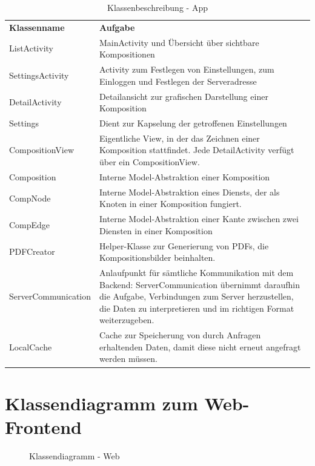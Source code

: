 \begin{table}[h]
	\centering
	\begin{tabularx}{\textwidth}{X X}
		\rowcolor[HTML]{C0C0C0} 
		\textbf{Klassenname} & \textbf{Aufgabe} \\
		ListActivity & MainActivity und Übersicht über sichtbare Kompositionen  \\
		\rowcolor[HTML]{E7E7E7} 
		SettingsActivity & Activity zum Festlegen von Einstellungen, zum Einloggen und Festlegen der Serveradresse \\
		DetailActivity & Detailansicht zur grafischen Darstellung einer Komposition \\
		\rowcolor[HTML]{E7E7E7} 
		Settings & Dient zur Kapselung der getroffenen Einstellungen \\
		CompositionView & Eigentliche View, in der das Zeichnen einer Komposition stattfindet. Jede DetailActivity verfügt über ein CompositionView. \\
		\rowcolor[HTML]{E7E7E7} 
		Composition & Interne Model-Abstraktion einer Komposition \\
		CompNode & Interne Model-Abstraktion eines Diensts, der als Knoten in einer Komposition fungiert. \\
		\rowcolor[HTML]{E7E7E7} 
		CompEdge & Interne Model-Abstraktion einer Kante zwischen zwei Diensten in einer Komposition \\
		PDFCreator & Helper-Klasse zur Generierung von PDFs, die Kompositionsbilder beinhalten. \\
			\rowcolor[HTML]{E7E7E7} 
		ServerCommunication & Anlaufpunkt für sämtliche Kommunikation mit dem Backend: ServerCommunication übernimmt daraufhin die Aufgabe, Verbindungen zum Server herzustellen, die Daten zu interpretieren und im richtigen Format weiterzugeben. \\
		LocalCache & Cache zur Speicherung von durch Anfragen erhaltenden Daten, damit diese nicht erneut angefragt werden müssen. 
	\end{tabularx}
	\caption{Klassenbeschreibung - App}
	\label{table:klassenbeschreibung-a}
\end{table}

\section*{Klassendiagramm zum Web-Frontend}

\begin{figure}[h]
	\centering
	\caption{Klassendiagramm - Web}
	\label{fig:klassendiagramm-web}
\end{figure}

